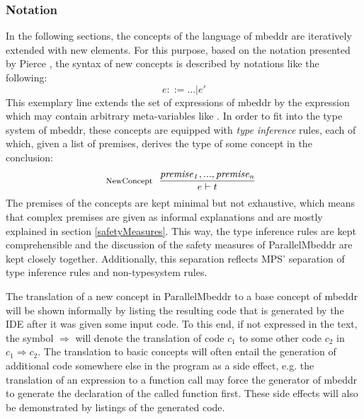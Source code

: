 \subsubsection{Notation}
In the following sections, the concepts of the language of mbeddr are iteratively extended with new elements. For this purpose, based on the notation presented by Pierce \cite{TypesAndProgrammingLanguages}, the syntax of new concepts is described by notations like the following:
\begin{equation}
e ::= ...| e'
\end{equation}
This exemplary line extends the set of expressions of mbeddr by the expression  which may contain arbitrary meta-variables like . In order to fit into the type system of mbeddr, these concepts are equipped with \textit{type inference} rules, each of which, given a list of premises, derives the type of some concept in the conclusion:
\begin{equation}
\inference*[NewConcept]{\mathit{premise_1}, ..., \mathit{premise_n}}{\qquad\quad e |- t \qquad\quad} 
\end{equation}
The premises of the concepts are kept minimal but not exhaustive, which means that complex premises are given as informal explanations and are mostly explained in section \ref{safetyMeasures}. This way, the type inference rules are kept comprehensible and the discussion of the safety measures of ParallelMbeddr are kept closely together. Additionally, this separation reflects MPS' separation of type inference rules and non-typesystem rules.

The translation of a new concept in ParallelMbeddr to a base concept of mbeddr will be shown informally by listing the resulting code that is generated by the IDE after it was given some input code. To this end, if not expressed in the text, the symbol $\Longrightarrow$ will denote the translation of code $c_1$ to some other code $c_2$ in $c_1 \Longrightarrow c_2$. The translation to basic concepts will often entail the generation of additional code somewhere else in the program as a side effect, e.g. the translation of an expression to a function call may force the generator of mbeddr to generate the declaration of the called function first. These side effects will also be demonstrated by listings of the generated code.